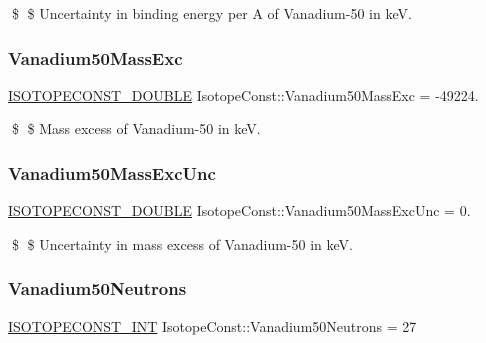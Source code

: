 \$ \$ Uncertainty in binding energy per A of Vanadium-\/50 in keV. \mbox{\label{group___isotope_const-_vanadium-_v50_ga58365841eaf94831af3e1e0d929caa69}} 
\subsubsection{\texorpdfstring{Vanadium50\+Mass\+Exc}{Vanadium50MassExc}}
{\footnotesize\ttfamily \mbox{\hyperlink{group___isotope_const-_macros_ga8f45a7272ce02c0b4c65c44636ed719a}{I\+S\+O\+T\+O\+P\+E\+C\+O\+N\+S\+T\+\_\+\+D\+O\+U\+B\+LE}} Isotope\+Const\+::\+Vanadium50\+Mass\+Exc = -\/49224.}

\$ \$ Mass excess of Vanadium-\/50 in keV. \mbox{\label{group___isotope_const-_vanadium-_v50_ga77d1c1fd4569a133c99478ebc7653f68}} 
\subsubsection{\texorpdfstring{Vanadium50\+Mass\+Exc\+Unc}{Vanadium50MassExcUnc}}
{\footnotesize\ttfamily \mbox{\hyperlink{group___isotope_const-_macros_ga8f45a7272ce02c0b4c65c44636ed719a}{I\+S\+O\+T\+O\+P\+E\+C\+O\+N\+S\+T\+\_\+\+D\+O\+U\+B\+LE}} Isotope\+Const\+::\+Vanadium50\+Mass\+Exc\+Unc = 0.}

\$ \$ Uncertainty in mass excess of Vanadium-\/50 in keV. \mbox{\label{group___isotope_const-_vanadium-_v50_gaec93923fa000b9e17447fc2af8336832}} 
\subsubsection{\texorpdfstring{Vanadium50\+Neutrons}{Vanadium50Neutrons}}
{\footnotesize\ttfamily \mbox{\hyperlink{group___isotope_const-_macros_ga5f18360b3e99483a35c32d789e62621c}{I\+S\+O\+T\+O\+P\+E\+C\+O\+N\+S\+T\+\_\+\+I\+NT}} Isotope\+Const\+::\+Vanadium50\+Neutrons = 27}

